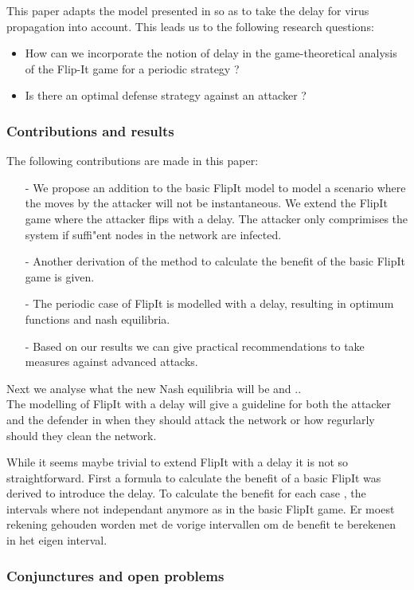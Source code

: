 This paper adapts the model presented in \cite{FlipIt} so as to take the delay for virus propagation into account.
This leads us to the following research questions:
\begin{itemize}
\item How can we incorporate the notion of delay in the game-theoretical analysis of the Flip-It game for a periodic strategy ?
\item Is there an optimal defense strategy against an attacker ? 
\end{itemize}



\subsubsection{Contributions and results}
The following contributions are made in this paper:
\begin{itemize}
\item[-] We propose an addition to the basic FlipIt model to model a scenario where the moves by the attacker will not be instantaneous. We extend the FlipIt game where the attacker flips with a delay. The attacker only comprimises the system if suffi"ent nodes in the network are infected. 
\item[-] Another derivation of the method to calculate the benefit of the basic FlipIt game is given.
\item[-] The periodic case of FlipIt is modelled with a delay, resulting in optimum functions and nash equilibria. 
\item[-] Based on our results we can give practical recommendations to take measures against advanced attacks. 
\end{itemize}
 Next we analyse what the new Nash equilibria will be and .. \\
 The modelling of FlipIt with a delay will give a guideline for both the attacker and the defender in when they should attack the network or how regurlarly should they clean the network.

While it seems maybe trivial to extend FlipIt with a delay it is not so straightforward. First a formula to calculate the benefit of a basic FlipIt was derived to introduce the delay. To calculate the benefit for each case , the intervals where not independant anymore as in the basic FlipIt game. Er moest rekening gehouden worden met de vorige intervallen om de benefit te berekenen in het eigen interval. 

\subsubsection{Conjunctures and open problems}

